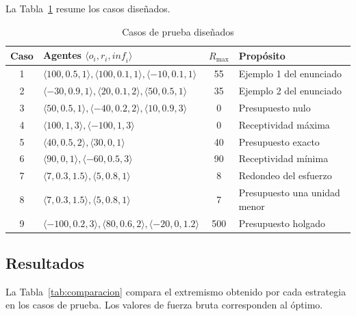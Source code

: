 \documentclass[11pt,letterpaper]{article}
\newcommand{\Rmax}{R_{\max}}
\begin{document}
La Tabla~\ref{tab:casos} resume los casos diseñados.

\begin{table}[H]
  \centering
  \caption{Casos de prueba diseñados}
  \label{tab:casos}
  \begin{tabular}{clc>{\raggedright\arraybackslash}p{5cm}}
    \toprule
    Caso & Agentes $\langle o_i, r_i, \mathit{inf}_i \rangle$ & $\Rmax$ & Propósito \\
    \midrule
    1 & $\langle 100,0.5,1\rangle, \langle 100,0.1,1\rangle, \langle -10,0.1,1\rangle$ & 55  & Ejemplo 1 del enunciado \\
    2 & $\langle -30,0.9,1\rangle, \langle 20,0.1,2\rangle, \langle 50,0.5,1\rangle$   & 35  & Ejemplo 2 del enunciado \\
    3 & $\langle 50,0.5,1\rangle, \langle -40,0.2,2\rangle, \langle 10,0.9,3\rangle$   & 0   & Presupuesto nulo \\
    4 & $\langle 100,1,3\rangle, \langle -100,1,3\rangle$                              & 0   & Receptividad máxima \\
    5 & $\langle 40,0.5,2\rangle, \langle 30,0,1\rangle$                               & 40  & Presupuesto exacto \\
    6 & $\langle 90,0,1\rangle, \langle -60,0.5,3\rangle$                              & 90  & Receptividad mínima \\
    7 & $\langle 7,0.3,1.5\rangle, \langle 5,0.8,1\rangle$                             & 8   & Redondeo del esfuerzo \\
    8 & $\langle 7,0.3,1.5\rangle, \langle 5,0.8,1\rangle$                             & 7   & Presupuesto una unidad menor \\
    9 & $\langle -100,0.2,3\rangle, \langle 80,0.6,2\rangle, \langle -20,0,1.2\rangle$ & 500 & Presupuesto holgado \\
    \bottomrule
  \end{tabular}
\end{table}

\subsection{Resultados}

La Tabla~\ref{tab:comparacion} compara el extremismo obtenido por cada
estrategia en los casos de prueba. Los valores de fuerza bruta corresponden al
óptimo.
\end{document}
